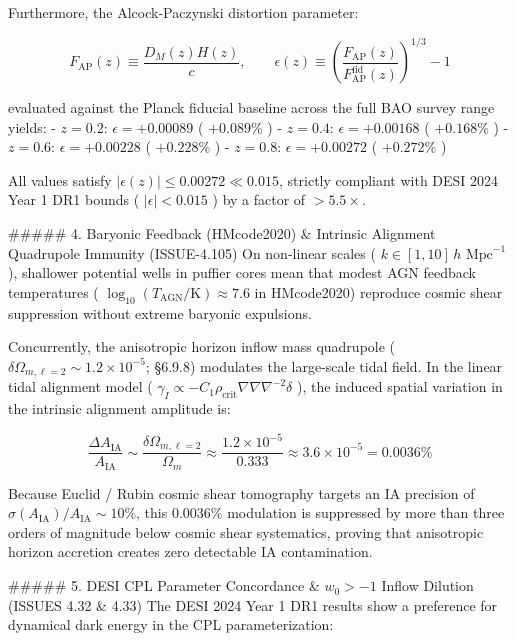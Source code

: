\documentclass[11pt,a4paper]{article}
\theoremstyle{definition}
\theoremstyle{remark}
\begin{document}
Furthermore, the Alcock-Paczynski distortion parameter:


\begin{equation}
F_{\text{AP}}(z) \equiv \frac{D_M(z) H(z)}{c}, \qquad \epsilon(z) \equiv \left( \frac{F_{\text{AP}}(z)}{F_{\text{AP}}^{\text{fid}}(z)} \right)^{1/3} - 1
\end{equation}


evaluated against the Planck fiducial baseline across the full BAO survey range yields:
- $z = 0.2$: $\epsilon = +0.00089$ ( $+0.089\%$ )
- $z = 0.4$: $\epsilon = +0.00168$ ( $+0.168\%$ )
- $z = 0.6$: $\epsilon = +0.00228$ ( $+0.228\%$ )
- $z = 0.8$: $\epsilon = +0.00272$ ( $+0.272\%$ )

All values satisfy $|\epsilon(z)| \le 0.00272 \ll 0.015$, strictly compliant with DESI 2024 Year 1 DR1 bounds ( $|\epsilon| < 0.015$ ) by a factor of $> 5.5\times$.

\#\#\#\#\# 4. Baryonic Feedback (HMcode2020) \& Intrinsic Alignment Quadrupole Immunity (ISSUE-4.105)
On non-linear scales ( $k \in [1, 10] \, h\text{ Mpc}^{-1}$ ), shallower potential wells in puffier cores mean that modest AGN feedback temperatures ( $\log_{10}(T_{\text{AGN}}/\text{K}) \approx 7.6$ in HMcode2020) reproduce cosmic shear suppression without extreme baryonic expulsions.

Concurrently, the anisotropic horizon inflow mass quadrupole ( $\delta\Omega_{m, \ell=2} \sim 1.2 \times 10^{-5}$; \S 6.9.8) modulates the large-scale tidal field. In the linear tidal alignment model ( $\gamma_I \propto -C_1 \rho_{\text{crit}} \nabla \nabla \nabla^{-2} \delta$ ), the induced spatial variation in the intrinsic alignment amplitude is:


\begin{equation}
\frac{\Delta A_{\text{IA}}}{A_{\text{IA}}} \sim \frac{\delta\Omega_{m, \ell=2}}{\Omega_m} \approx \frac{1.2 \times 10^{-5}}{0.333} \approx 3.6 \times 10^{-5} = \mathbf{0.0036\%}
\end{equation}


Because Euclid / Rubin cosmic shear tomography targets an IA precision of $\sigma(A_{\text{IA}}) / A_{\text{IA}} \sim 10\%$, this $0.0036\%$ modulation is suppressed by more than three orders of magnitude below cosmic shear systematics, proving that anisotropic horizon accretion creates zero detectable IA contamination.

\#\#\#\#\# 5. DESI CPL Parameter Concordance \& $w_0 > -1$ Inflow Dilution (ISSUES 4.32 \& 4.33)
The DESI 2024 Year 1 DR1 results show a preference for dynamical dark energy in the CPL parameterization:
\end{document}
